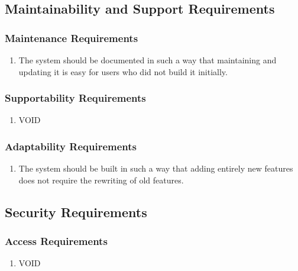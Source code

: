 \documentclass[english]{article}
\begin{document}

\subsection{Maintainability and Support Requirements}
\label{sub:maintainability_and_support_requirements}

\subsubsection{Maintenance Requirements}
\label{ssub:maintenance_requirements}
\begin{enumerate}[{MR}1. ]
	\item The system should be documented in such a way that maintaining and updating it is easy for users who did not build it initially.
\end{enumerate}

\subsubsection{Supportability Requirements}
\label{ssub:supportability_requirements}
\begin{enumerate}[{MSR}1. ]
	\item VOID
\end{enumerate}

\subsubsection{Adaptability Requirements}
\label{ssub:adaptability_requirements}
\begin{enumerate}[{MAR}1. ]
	\item The system should be built in such a way that adding entirely new features does not require the rewriting of old features. 
\end{enumerate}


\subsection{Security Requirements}
\label{sub:security_requirements}

\subsubsection{Access Requirements}
\label{ssub:access_requirements}
\begin{enumerate}[{SAR}1. ]
	\item VOID
\end{enumerate}
\end{document}

